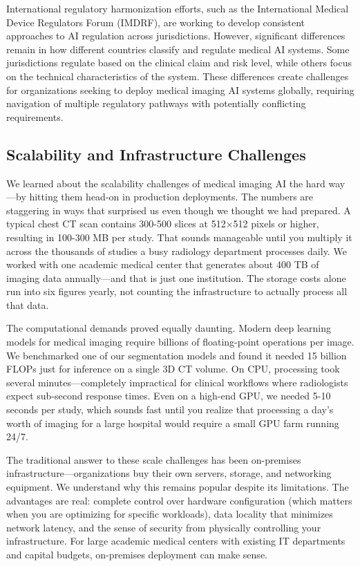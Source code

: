 \documentclass[12pt,a4paper]{article}
\begin{document}
International regulatory harmonization efforts, such as the International Medical Device Regulators Forum (IMDRF), are working to develop consistent approaches to AI regulation across jurisdictions. However, significant differences remain in how different countries classify and regulate medical AI systems. Some jurisdictions regulate based on the clinical claim and risk level, while others focus on the technical characteristics of the system. These differences create challenges for organizations seeking to deploy medical imaging AI systems globally, requiring navigation of multiple regulatory pathways with potentially conflicting requirements.

\subsection{Scalability and Infrastructure Challenges}

We learned about the scalability challenges of medical imaging AI the hard way—by hitting them head-on in production deployments. The numbers are staggering in ways that surprised us even though we thought we had prepared. A typical chest CT scan contains 300-500 slices at 512×512 pixels or higher, resulting in 100-300 MB per study. That sounds manageable until you multiply it across the thousands of studies a busy radiology department processes daily. We worked with one academic medical center that generates about 400 TB of imaging data annually—and that is just one institution. The storage costs alone run into six figures yearly, not counting the infrastructure to actually process all that data.

The computational demands proved equally daunting. Modern deep learning models for medical imaging require billions of floating-point operations per image. We benchmarked one of our segmentation models and found it needed 15 billion FLOPs just for inference on a single 3D CT volume. On CPU, processing took several minutes—completely impractical for clinical workflows where radiologists expect sub-second response times. Even on a high-end GPU, we needed 5-10 seconds per study, which sounds fast until you realize that processing a day's worth of imaging for a large hospital would require a small GPU farm running 24/7.

The traditional answer to these scale challenges has been on-premises infrastructure—organizations buy their own servers, storage, and networking equipment. We understand why this remains popular despite its limitations. The advantages are real: complete control over hardware configuration (which matters when you are optimizing for specific workloads), data locality that minimizes network latency, and the sense of security from physically controlling your infrastructure. For large academic medical centers with existing IT departments and capital budgets, on-premises deployment can make sense.
\end{document}

